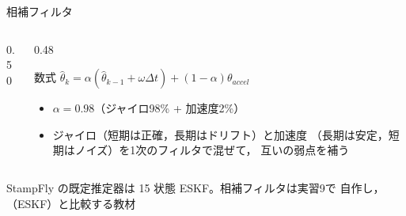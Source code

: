\begin{frame}{相補フィルタ}
  \begin{columns}[c]
    \begin{column}{0.50\textwidth}
      \centering
    \end{column}
    \begin{column}{0.48\textwidth}
      \begin{block}{数式}\footnotesize
        $\hat\theta_k = \alpha(\hat\theta_{k-1}+\omega\Delta t) + (1-\alpha)\theta_{accel}$
      \end{block}
      \vspace{0.3em}
      \begin{itemize}\footnotesize
        \item $\alpha=0.98$（ジャイロ98\% + 加速度2\%）
        \item ジャイロ（短期は正確，長期はドリフト）と加速度
              （長期は安定，短期はノイズ）を1次のフィルタで混ぜて，
              互いの弱点を補う
      \end{itemize}
    \end{column}
  \end{columns}

  \vspace{0.3em}

  {\footnotesize StampFly の既定推定器は 15 状態 ESKF。相補フィルタは実習9で
  自作し，（ESKF）と比較する教材}
\end{frame}

